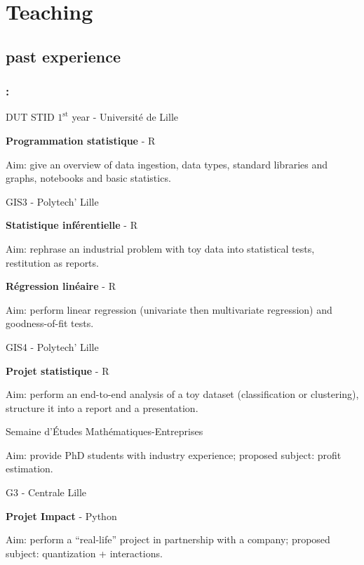 \documentclass[english,xcolor={rgb,dvipsnames,table,usenames}]{beamer}
\begin{document}
\section{Teaching}

\subsection{past experience}

\begin{frame}[allowframebreaks]
\frametitle{\secname : \subsecname}

\begin{block}{DUT STID $1^{\text{st}}$ year - Université de Lille}

\textbf{Programmation statistique} - \textsf{R}

Aim: give an overview of data ingestion, data types, standard libraries and graphs, notebooks and basic statistics.
\end{block}

\begin{block}{GIS3 - Polytech' Lille}

\textbf{Statistique inférentielle} - \textsf{R}

Aim: rephrase an industrial problem with toy data into statistical tests, restitution as reports.

\medskip

\textbf{Régression linéaire} - \textsf{R}

Aim: perform linear regression (univariate then multivariate regression) and goodness-of-fit tests.
\end{block}

\pagebreak

\begin{block}{GIS4 - Polytech' Lille}

\textbf{Projet statistique} - \textsf{R}

Aim: perform an end-to-end analysis of a toy dataset (classification or clustering), structure it into a report and a presentation.
\end{block}

\begin{block}{Semaine d'\'Etudes Mathématiques-Entreprises}

Aim: provide PhD students with industry experience; proposed subject: profit estimation.
\end{block}

\begin{block}{G3 - Centrale Lille}

\textbf{Projet Impact} - Python

Aim: perform a ``real-life'' project in partnership with a company; proposed subject: quantization + interactions.

\end{block}

\end{frame}
\end{document}
